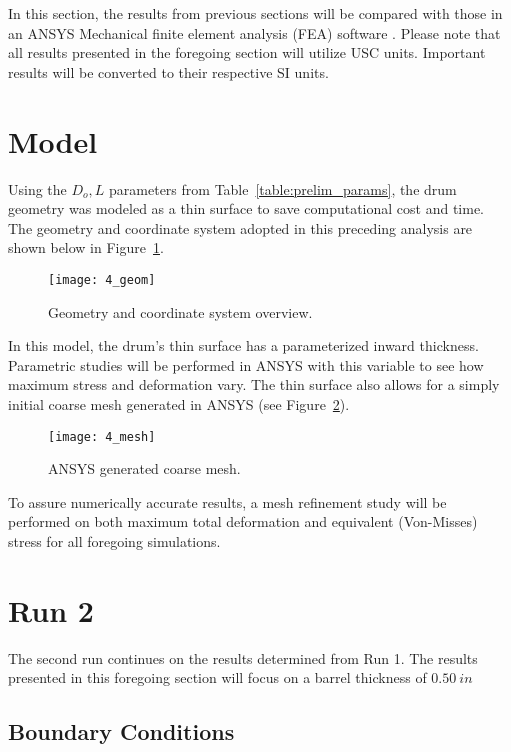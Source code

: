 In this section, the results from previous sections will be compared with those in an ANSYS Mechanical finite element analysis (FEA) software \cite{ANSYS}. Please note that all results presented in the foregoing section will utilize USC units. Important results will be converted to their respective SI units.

\section{Model}

Using the $D_o , L$ parameters from Table~\ref{table:prelim_params}, the drum geometry was modeled as a thin surface to save computational cost and time. The geometry and coordinate system adopted in this preceding analysis are shown below in Figure~\ref{fig:4_geom}.

\begin{figure}[H]
	\centering
	\texttt{[image: 4\_geom]}
	\caption{Geometry and coordinate system overview.}
	\label{fig:4_geom}
\end{figure}

In this model, the drum's thin surface has a parameterized inward thickness. Parametric studies will be performed in ANSYS with this variable to see how maximum stress and deformation vary. The thin surface also allows for a simply initial coarse mesh generated in ANSYS (see Figure~\ref{fig:4_mesh}).

\begin{figure}[H]
	\centering
	\texttt{[image: 4\_mesh]}
	\caption{ANSYS generated coarse mesh.}
	\label{fig:4_mesh}
\end{figure}

To assure numerically accurate results, a mesh refinement study will be performed on both maximum total deformation and equivalent (Von-Misses) stress for all foregoing simulations.

\section{Run 2}

The second run continues on the results determined from Run 1. The results presented in this foregoing section will focus on a barrel thickness of $0.50\ in$ 

\subsection{Boundary Conditions}

